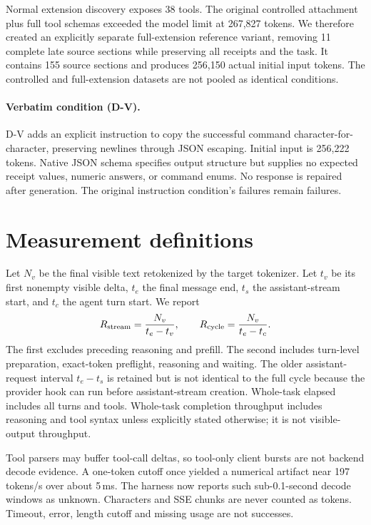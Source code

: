 \documentclass[11pt]{article}
\begin{document}
Normal extension discovery exposes 38 tools. The original controlled attachment plus full tool schemas exceeded the model limit at 267,827 tokens. We therefore created an explicitly separate full-extension reference variant, removing 11 complete late source sections while preserving all receipts and the task. It contains 155 source sections and produces 256,150 actual initial input tokens. The controlled and full-extension datasets are not pooled as identical conditions.

\paragraph{Verbatim condition (D-V).} D-V adds an explicit instruction to copy the successful command character-for-character, preserving newlines through JSON escaping. Initial input is 256,222 tokens. Native JSON schema specifies output structure but supplies no expected receipt values, numeric answers, or command enums. No response is repaired after generation. The original instruction condition's failures remain failures.

\section{Measurement definitions}
Let $N_v$ be the final visible text retokenized by the target tokenizer. Let $t_v$ be its first nonempty visible delta, $t_e$ the final message end, $t_s$ the assistant-stream start, and $t_c$ the agent turn start. We report
\[
R_{\rm stream}=\frac{N_v}{t_e-t_v},\qquad
R_{\rm cycle}=\frac{N_v}{t_e-t_c}.
\]
The first excludes preceding reasoning and prefill. The second includes turn-level preparation, exact-token preflight, reasoning and waiting. The older assistant-request interval $t_e-t_s$ is retained but is not identical to the full cycle because the provider hook can run before assistant-stream creation. Whole-task elapsed includes all turns and tools. Whole-task completion throughput includes reasoning and tool syntax unless explicitly stated otherwise; it is not visible-output throughput.

Tool parsers may buffer tool-call deltas, so tool-only client bursts are not backend decode evidence. A one-token cutoff once yielded a numerical artifact near 197 tokens/s over about 5\,ms. The harness now reports such sub-0.1-second decode windows as unknown. Characters and SSE chunks are never counted as tokens. Timeout, error, length cutoff and missing usage are not successes.
\end{document}
